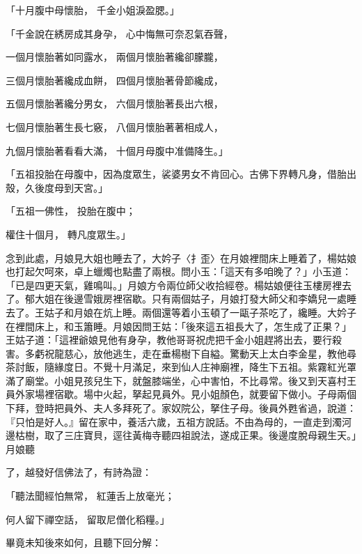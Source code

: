 「十月腹中母懷胎，  千金小姐淚盈腮。」

「千金說在綉房成其身孕，  心中悔無可奈忍氣吞聲，

一個月懷胎著如同露水，  兩個月懷胎著纔卻朦朧，

三個月懷胎著纔成血餅，  四個月懷胎著骨節纔成，

五個月懷胎著纔分男女，  六個月懷胎著長出六根，

七個月懷胎著生長七竅，  八個月懷胎著著相成人，

九個月懷胎著看看大滿，  十個月母腹中准備降生。」

「五祖投胎在母腹中，因為度眾生，裟婆男女不肯回心。古佛下界轉凡身，借胎出殼，久後度母到天宮。」

「五祖一佛性，  投胎在腹中；

權住十個月，  轉凡度眾生。」

念到此處，月娘見大姐也睡去了，大妗子〈扌歪〉在月娘裡間床上睡着了，楊姑娘也打起欠呵來，卓上蠟燭也點盡了兩根。問小玉：「這天有多咱晚了？」小玉道：「已是四更天氣，雞鳴叫。」月娘方令兩位師父收拾經卷。楊姑娘便往玉樓房裡去了。郁大姐在後邊雪娥房裡宿歇。只有兩個姑子，月娘打發大師父和李嬌兒一處睡去了。王姑子和月娘在炕上睡。兩個還等着小玉頓了一甌子茶吃了，纔睡。大妗子在裡間床上，和玉簫睡。月娘因問王姑：「後來這五祖長大了，怎生成了正果？」王姑子道：「這裡爺娘見他有身孕，教他哥哥祝虎把千金小姐趕將出去，要行殺害。多虧祝龍慈心，放他逃生，走在垂楊樹下自縊。驚動天上太白李金星，教他尋茶討飯，隨緣度日。不覺十月滿足，來到仙人庄神廟裡，降生下五祖。紫霧紅光罩滿了廟堂。小姐見孩兒生下，就盤膝端坐，心中害怕，不比尋常。後又到天喜村王員外家場裡宿歇。場中火起，拏起見員外。見小姐顏色，就要留下做小。子母兩個下拜，登時把員外、夫人多拜死了。家奴院公，拏住子母。後員外甦省過，說道：『只怕是好人。』留在家中，養活六歲，五祖方說話。不由為母的，一直走到濁河邊枯樹，取了三庄寶貝，逕往黃梅寺聽四祖說法，遂成正果。後邊度脫母親生天。」月娘聽

了，越發好信佛法了，有詩為證：

「聽法聞經怕無常，  紅蓮舌上放毫光；

何人留下禪空話，  留取尼僧化稻糧。」

畢竟未知後來如何，且聽下回分解：

